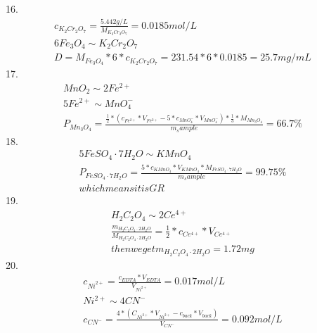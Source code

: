 \documentclass{article}
\begin{document}
16.\begin{equation}
    \begin{multlined}
        c_{K_2Cr_2O_7} = \frac{5.442 g/L}{M_{K_2Cr_2O_7}} = 0.0185mol/L\\
        6Fe_3O_4 \sim K_2Cr_2O_7\\
        D = M_{Fe_3O_4} * 6 * c_{K_2Cr_2O_7} = 231.54 * 6 * 0.0185 = 25.7 mg/mL
    \end{multlined}
\end{equation}
17. \begin{equation}
    \begin{multlined}
        MnO_2 \sim 2Fe^{2+}\\
        5Fe^{2+} \sim MnO_4^-\\
        P_{Mn_3O_4} = \frac{\frac{1}{2}*\left(c_{Fe^{2+}}*V_{Fe^{2+}} - 5*c_{MnO_4^-}*V_{MnO_4^-}\right)* \frac{1}{3}*M_{Mn_3O_4}}{m_sample} = 66.7\%
    \end{multlined}
\end{equation}
18.\begin{equation}
    \begin{multlined}
        5FeSO_4\cdot7H_2O \sim KMnO_4\\
        P_{FeSO_4\cdot7H_2O} = \frac{5*c_{KMnO_4}*V_{KMnO_4}*M_{FeSO_4\cdot7H_2O}}{m_sample} = 99.75\%\\
        which means it is GR
    \end{multlined}
\end{equation}
19.\begin{equation}
    \begin{multlined}
        H_2C_2O_4 \sim 2Ce^{4+}\\
        \frac{m_{H_2C_2O_4\cdot2H_2O}}{M_{H_2C_2O_4\cdot2H_2O}} = \frac{1}{2} * c_{Ce^{4+}} * V_{Ce^{4+}}\\
        then we get m_{H_2C_2O_4\cdot2H_2O} = 1.72mg
    \end{multlined}
\end{equation}
20. \begin{equation}
    \begin{multlined}
        c_{Ni^{2+}} = \frac{c_{EDTA}*V_{EDTA}}{V_{Ni^{2+}}} = 0.017mol/L\\
        Ni^{2+} \sim 4CN^{-}\\
        c_{CN^{-}} = \frac{4*\left(C_{Ni^{2+}}*V_{Ni^{2+}} - c_{back}*V_{back}\right)}{V_{CN^-}} = 0.092mol/L
    \end{multlined}
\end{equation}
\end{document}
